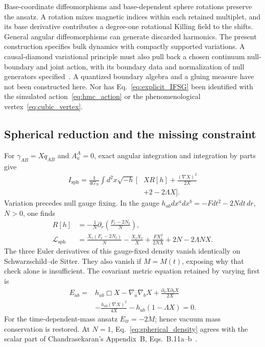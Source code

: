 Base-coordinate diffeomorphisms and base-dependent sphere rotations preserve the ansatz. A rotation mixes magnetic indices within each retained multiplet, and its base derivative contributes a degree-one rotational Killing field to the shifts. General angular diffeomorphisms can generate discarded harmonics. The present construction specifies bulk dynamics with compactly supported variations. A causal-diamond variational principle must also pull back a chosen continuum null-boundary and joint action, with its boundary data and normalization of null generators specified~\cite{LehnerEtAl2016}. A quantized boundary algebra and a gluing measure have not been constructed here. Nor has Eq.~\eqref{eq:explicit_IFSG} been identified with the simulated action~\eqref{eq:hmc_action} or the phenomenological vertex~\eqref{eq:cubic_vertex}.



\subsection{Spherical reduction and the missing constraint}

For $\gamma_{AB}=Xq_{AB}$ and $A_a^A=0$, exact angular integration and integration by parts give
\begin{align}\label{eq:spherical_repair}
I_{\mathrm{sph}}=\frac1{4G_N}\int d^2x\sqrt{-h}\,
\Big[&XR[h]+\frac{(\nabla X)^2}{2X}\nonumber\\
&+2-2\Lambda X\Big].
\end{align}
Variation precedes null gauge fixing. In the gauge $h_{ab}dx^a dx^b=-Fdt^2-2Ndt\,dr$, $N>0$, one finds
\begin{align}
R[h]&=-\frac1N\partial_r\!\left(\frac{F_r-2N_t}{N}\right),\nonumber\\
\mathcal L_{\mathrm{sph}}&=\frac{X_r(F_r-2N_t)}N-\frac{X_tX_r}X
+\frac{FX_r^2}{2NX}+2N-2\Lambda NX.\label{eq:spherical_density}
\end{align}
The three Euler derivatives of this gauge-fixed density vanish identically on Schwarzschild--de Sitter. They also vanish if $M=M(t)$, exposing why that check alone is insufficient. The covariant metric equation retained by varying first is
\begin{align}
E_{ab}={}&h_{ab}\Box X-\nabla_a\nabla_bX
+\frac{\partial_aX\partial_bX}{2X}\nonumber\\
&-\frac{h_{ab}(\nabla X)^2}{4X}-h_{ab}(1-\Lambda X)=0.
\end{align}
For the time-dependent-mass ansatz $E_{tt}=-2\dot M$; hence vacuum mass conservation is restored. At $N=1$, Eq.~\eqref{eq:spherical_density} agrees with the scalar part of Chandrasekaran's Appendix~B, Eqs.~B.11a--b~\cite{Chandrasekaran2026}.

